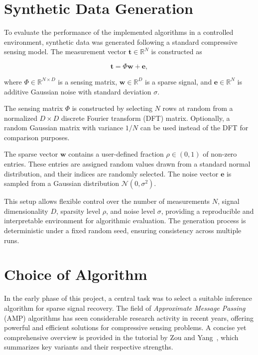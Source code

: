 \documentclass{article}
\begin{document}
\section{Synthetic Data Generation}

To evaluate the performance of the implemented algorithms in a controlled environment, synthetic data was generated following a standard compressive sensing model. The measurement vector $ \mathbf{t} \in \mathbb{R}^N $ is constructed as

\begin{equation}
    \mathbf{t} = \Phi \mathbf{w} + \mathbf{e},
\end{equation}

where $ \Phi \in \mathbb{R}^{N \times D} $ is a sensing matrix, $ \mathbf{w} \in \mathbb{R}^{D} $ is a sparse signal, and $ \mathbf{e} \in \mathbb{R}^{N} $ is additive Gaussian noise with standard deviation $ \sigma $.

The sensing matrix $ \Phi $ is constructed by selecting $ N $ rows at random from a normalized $ D \times D $ discrete Fourier transform (DFT) matrix. Optionally, a random Gaussian matrix with variance $1/N$ can be used instead of the DFT for comparison purposes.

The sparse vector $ \mathbf{w} $ contains a user-defined fraction $ \rho \in (0, 1) $ of non-zero entries. These entries are assigned random values drawn from a standard normal distribution, and their indices are randomly selected. The noise vector $ \mathbf{e} $ is sampled from a Gaussian distribution $ \mathcal{N}(0, \sigma^2) $.

This setup allows flexible control over the number of measurements $ N $, signal dimensionality $ D $, sparsity level $ \rho $, and noise level $ \sigma $, providing a reproducible and interpretable environment for algorithmic evaluation. The generation process is deterministic under a fixed random seed, ensuring consistency across multiple runs.


\section{Choice of Algorithm}

In the early phase of this project, a central task was to select a suitable inference algorithm for sparse signal recovery. The field of \emph{Approximate Message Passing} (AMP) algorithms has seen considerable research activity in recent years, offering powerful and efficient solutions for compressive sensing problems. A concise yet comprehensive overview is provided in the tutorial by Zou and Yang~\cite{zou2022concise}, which summarizes key variants and their respective strengths.
\end{document}
